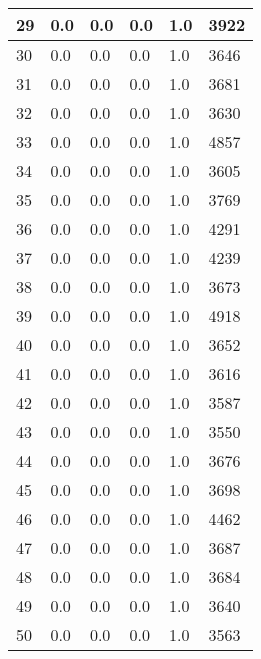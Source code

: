 \begin{longtable}{|l|l|l|l|l|l|}
29 & 0.0 & 0.0 & 0.0 & 1.0 & 3922 \\ \hline 
30 & 0.0 & 0.0 & 0.0 & 1.0 & 3646 \\ \hline 
31 & 0.0 & 0.0 & 0.0 & 1.0 & 3681 \\ \hline 
32 & 0.0 & 0.0 & 0.0 & 1.0 & 3630 \\ \hline 
33 & 0.0 & 0.0 & 0.0 & 1.0 & 4857 \\ \hline 
34 & 0.0 & 0.0 & 0.0 & 1.0 & 3605 \\ \hline 
35 & 0.0 & 0.0 & 0.0 & 1.0 & 3769 \\ \hline 
36 & 0.0 & 0.0 & 0.0 & 1.0 & 4291 \\ \hline 
37 & 0.0 & 0.0 & 0.0 & 1.0 & 4239 \\ \hline 
38 & 0.0 & 0.0 & 0.0 & 1.0 & 3673 \\ \hline 
39 & 0.0 & 0.0 & 0.0 & 1.0 & 4918 \\ \hline 
40 & 0.0 & 0.0 & 0.0 & 1.0 & 3652 \\ \hline 
41 & 0.0 & 0.0 & 0.0 & 1.0 & 3616 \\ \hline 
42 & 0.0 & 0.0 & 0.0 & 1.0 & 3587 \\ \hline 
43 & 0.0 & 0.0 & 0.0 & 1.0 & 3550 \\ \hline 
44 & 0.0 & 0.0 & 0.0 & 1.0 & 3676 \\ \hline 
45 & 0.0 & 0.0 & 0.0 & 1.0 & 3698 \\ \hline 
46 & 0.0 & 0.0 & 0.0 & 1.0 & 4462 \\ \hline 
47 & 0.0 & 0.0 & 0.0 & 1.0 & 3687 \\ \hline 
48 & 0.0 & 0.0 & 0.0 & 1.0 & 3684 \\ \hline 
49 & 0.0 & 0.0 & 0.0 & 1.0 & 3640 \\ \hline 
50 & 0.0 & 0.0 & 0.0 & 1.0 & 3563 \\ \hline 
\end{longtable}